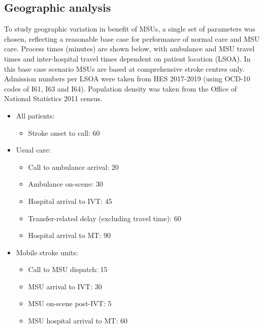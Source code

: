 \subsection{Geographic analysis}

To study geographic variation in benefit of MSUs, a single set of parameters was chosen, reflecting a reasonable base case for performance of normal care and MSU care. Process times (minutes) are shown below, with ambulance and MSU travel times and inter-hospital travel times dependent on patient location (LSOA). In this base case scenario MSUs are based at comprehensive stroke centres only. Admission numbers per LSOA were taken from HES 2017-2019 (using OCD-10 codes of I61, I63 and I64). Population density was taken from the Office of National Statistics 2011 census.


\begin{minipage}{1.0\textwidth}  %
\begin{spacing}{1.2}
\begin{itemize}
    \item All patients:
    \begin{itemize}
        \item Stroke onset to call: 60
    \end{itemize}
    \item Usual care:
    \begin{itemize}
        \item Call to ambulance arrival: 20
        \item Ambulance on-scene: 30
        \item Hospital arrival to IVT: 45
        \item Transfer-related delay (excluding travel time): 60
        \item Hospital arrival to MT: 90
    \end{itemize}
    \item Mobile stroke units:
    \begin{itemize}
        \item Call to MSU dispatch: 15
        \item MSU arrival to IVT: 30
        \item MSU on-scene post-IVT: 5
        \item MSU hospital arrival to MT: 60
    \end{itemize}
\end{itemize}
\end{spacing}
\end{minipage}


